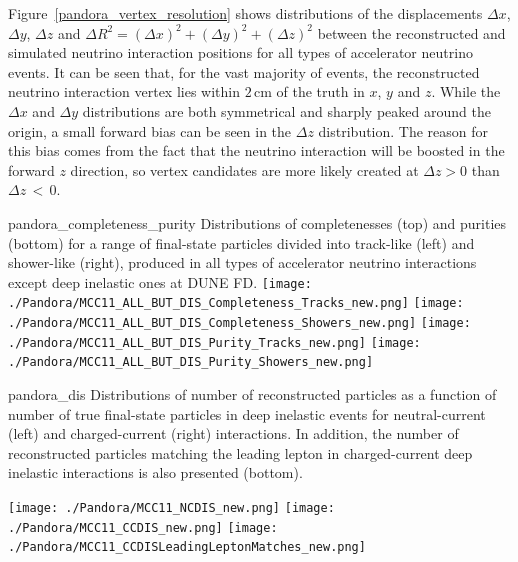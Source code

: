Figure~\ref{pandora_vertex_resolution} shows distributions of the displacements $\Delta x$, $\Delta y$, $\Delta z$ and $\Delta R^{2} = (\Delta x)^2 + (\Delta y)^2 + (\Delta z)^2$ between the reconstructed and simulated neutrino interaction positions for all types of accelerator neutrino events. It can be seen that, for the vast majority of events, the reconstructed neutrino interaction vertex lies within $2$\,cm of the  truth in $x$, $y$ and $z$. While the $\Delta x$ and $\Delta y$ distributions are both symmetrical and sharply peaked around the origin, a small forward bias can be seen in the $\Delta z$ distribution. The reason for this bias comes from the fact that the neutrino interaction will be boosted in the forward $z$ direction, so vertex candidates are more likely created at $\Delta z>0$ than $\Delta z\,<\,0$.  

\begin{dunefigure}
{pandora_completeness_purity}
{Distributions of completenesses (top) and purities (bottom) for a range of final-state particles divided into track-like (left) and shower-like (right), produced in all types of accelerator neutrino interactions except deep inelastic ones at DUNE FD.}
\texttt{[image: ./Pandora/MCC11\_ALL\_BUT\_DIS\_Completeness\_Tracks\_new.png]}
\texttt{[image: ./Pandora/MCC11\_ALL\_BUT\_DIS\_Completeness\_Showers\_new.png]}
\texttt{[image: ./Pandora/MCC11\_ALL\_BUT\_DIS\_Purity\_Tracks\_new.png]}
\texttt{[image: ./Pandora/MCC11\_ALL\_BUT\_DIS\_Purity\_Showers\_new.png]}\end{dunefigure}

\begin{dunefigure}
{pandora_dis}
{Distributions of number of reconstructed particles as a function of number of true final-state particles in deep inelastic events for neutral-current (left) and charged-current (right) %
interactions. In addition, the number of reconstructed particles matching the leading lepton in charged-current deep inelastic interactions is also presented (bottom).} %

\texttt{[image: ./Pandora/MCC11\_NCDIS\_new.png]}
\texttt{[image: ./Pandora/MCC11\_CCDIS\_new.png]}
\texttt{[image: ./Pandora/MCC11\_CCDISLeadingLeptonMatches\_new.png]}
\end{dunefigure}

